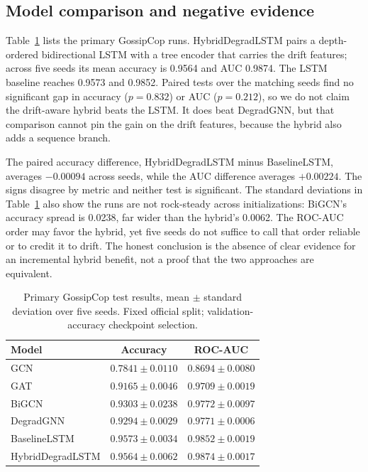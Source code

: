 \documentclass[conference]{IEEEtran}
\begin{document}
\subsection{Model comparison and negative evidence}
Table~\ref{tab:models} lists the primary GossipCop runs. HybridDegradLSTM pairs
a depth-ordered bidirectional LSTM with a tree encoder that carries the drift
features; across five seeds its mean accuracy is 0.9564 and AUC 0.9874. The
LSTM baseline reaches 0.9573 and 0.9852. Paired tests over the matching seeds
find no significant gap in accuracy ($p=0.832$) or AUC ($p=0.212$), so we do
not claim the drift-aware hybrid beats the LSTM. It does beat DegradGNN, but
that comparison cannot pin the gain on the drift features, because the hybrid
also adds a sequence branch.

The paired accuracy difference, HybridDegradLSTM minus BaselineLSTM, averages
$-0.00094$ across seeds, while the AUC difference averages $+0.00224$. The
signs disagree by metric and neither test is significant. The standard
deviations in Table~\ref{tab:models} also show the runs are not rock-steady
across initializations: BiGCN's accuracy spread is 0.0238, far wider than the
hybrid's 0.0062. The ROC-AUC order may favor the hybrid, yet five seeds do not
suffice to call that order reliable or to credit it to drift. The honest
conclusion is the absence of clear evidence for an incremental hybrid benefit,
not a proof that the two approaches are equivalent.

\begin{table}[t]
\caption{Primary GossipCop test results, mean $\pm$ standard deviation over
five seeds. Fixed official split; validation-accuracy checkpoint selection.}
\label{tab:models}
\centering
\footnotesize
\setlength{\tabcolsep}{3.3pt}
\begin{tabular}{lcc}
\toprule
Model & Accuracy & ROC-AUC \\
\midrule
GCN & $0.7841\pm0.0110$ & $0.8694\pm0.0080$ \\
GAT & $0.9165\pm0.0046$ & $0.9709\pm0.0019$ \\
BiGCN & $0.9303\pm0.0238$ & $0.9772\pm0.0097$ \\
DegradGNN & $0.9294\pm0.0029$ & $0.9771\pm0.0006$ \\
BaselineLSTM & $0.9573\pm0.0034$ & $0.9852\pm0.0019$ \\
HybridDegradLSTM & $0.9564\pm0.0062$ & $0.9874\pm0.0017$ \\
\bottomrule
\end{tabular}
\end{table}
\end{document}
